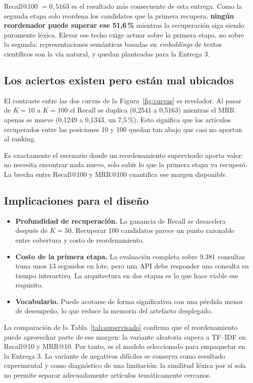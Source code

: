 \documentclass[11pt]{article}
\begin{document}
Recall@100 $=0{,}5163$ es el resultado más consecuente de esta entrega. Como la segunda etapa solo reordena los candidatos que la primera recupera, \textbf{ningún reordenador puede superar ese 51,6\,\%} mientras la recuperación siga siendo puramente léxica. Elevar ese techo exige actuar sobre la primera etapa, no sobre la segunda: representaciones semánticas basadas en \textit{embeddings} de textos científicos son la vía natural, y quedan planteadas para la Entrega 3.

\subsection{Los aciertos existen pero están mal ubicados}

El contraste entre las dos curvas de la Figura~\ref{fig:curvas} es revelador. Al pasar de $K=10$ a $K=100$ el Recall se duplica (0,2541 a 0,5163) mientras el MRR apenas se mueve (0,1249 a 0,1343, un 7,5\,\%). Esto significa que los artículos recuperados entre las posiciones 10 y 100 quedan tan abajo que casi no aportan al ranking.

Es exactamente el escenario donde un reordenamiento supervisado aporta valor: no necesita encontrar nada nuevo, solo subir lo que la primera etapa ya recuperó. La brecha entre Recall@100 y MRR@100 cuantifica ese margen disponible.

\subsection{Implicaciones para el diseño}

\begin{itemize}[leftmargin=1.4em, itemsep=1pt, topsep=2pt]
  \item \textbf{Profundidad de recuperación.} La ganancia de Recall se desacelera después de $K=50$. Recuperar 100 candidatos parece un punto razonable entre cobertura y costo de reordenamiento.
  \item \textbf{Costo de la primera etapa.} La evaluación completa sobre 9.381 consultas toma unos 13 segundos en lote, pero una API debe responder una consulta en tiempo interactivo. La arquitectura en dos etapas es lo que hace viable ese requisito.
  \item \textbf{Vocabulario.} Puede acotarse de forma significativa con una pérdida menor de desempeño, lo que reduce la memoria del artefacto desplegado.
\end{itemize}

La comparación de la Tabla~\ref{tab:supervisado} confirma que el reordenamiento puede aprovechar parte de ese margen: la variante aleatoria supera a TF--IDF en Recall@10 y MRR@10. Por tanto, es el modelo seleccionado para empaquetar en la Entrega 3. La variante de negativos difíciles se conserva como resultado experimental y como diagnóstico de una limitación: la similitud léxica por sí sola no permite separar adecuadamente artículos temáticamente cercanos.
\end{document}
